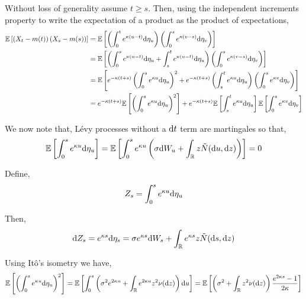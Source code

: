 \documentclass[10pt]{article}
\begin{document}
\begin{solution}[Solution]
\begin{enumerate}[label=(\alph*)]
        Without loss of generality assume \( t\geq s \). Then, using the independent increments property to write the expectation of a product as the product of expectations,
        \begin{align*}
            \mathbb{E} \left[ \left( X_t - m(t) \right) \left( X_s-m(s) \right) \right]
            &= \mathbb{E} \left[ \left( \int_{0}^{t} e^{\kappa(u-t)} \mathrm{d} \eta_u \right) \left( \int_{0}^{s}e^{\kappa(v-s)}\mathrm{d} \eta_v \right) \right]
            \\&= \mathbb{E} \left[ \left( \int_{0}^{s} e^{\kappa(u-t)} \mathrm{d} \eta_u + \int_{s}^{t} e^{\kappa(u-t)} \mathrm{d} \eta_u\right) \left( \int_{0}^{s}e^{\kappa(v-s)}\mathrm{d} \eta_v \right) \right]
            \\&= \mathbb{E} \left[ e^{-\kappa(t+s)} \left(\int_{0}^{s} e^{\kappa u} \mathrm{d} \eta_u \right)^2 + e^{-\kappa(t+s)}\left( \int_{s}^{t} e^{\kappa u} \mathrm{d} \eta_u\right) \left( \int_{0}^{s}e^{\kappa v}\mathrm{d} \eta_v \right) \right] 
            \\&= e^{-\kappa(t+s)}\mathbb{E} \left[ \left(\int_{0}^{s} e^{\kappa u} \mathrm{d} \eta_u \right)^2 \right] + e^{-\kappa(t+s)} \mathbb{E} \left[ \int_{s}^{t} e^{\kappa u} \mathrm{d} \eta_u\right] \mathbb{E}\left[ \int_{0}^{s}e^{\kappa v}\mathrm{d} \eta_v \right] 
        \end{align*}
        
        We now note that, L\'evy processes without a \( \mathrm{d} t \) term are martingales so that,
        \begin{align*}
            \mathbb{E} \left[ \int_{0}^{s} e^{\kappa u} \mathrm{d} \eta_u \right]
            = \mathbb{E} \left[ \int_{0}^{s} e^{\kappa u} \left(\sigma \mathrm{d} W_u + \int_{\mathbb{R}} z \tilde{N}(\mathrm{d} u, \mathrm{d} z) \right) \right] 
            = 0
        \end{align*}
        
        Define,
        \begin{align*}
            Z_s = \int_{0}^{s} e^{\kappa u} \mathrm{d} \eta_u
        \end{align*}

        Then,
        \begin{align*}
            \mathrm{d} Z_s = e^{\kappa s} \mathrm{d} \eta_s 
            = \sigma e^{\kappa s} \mathrm{d} W_s + \int_{\mathbb{R}} e^{\kappa s} z \tilde{N}(\mathrm{d} s,\mathrm{d} z)
        \end{align*}
        
        
        Using It\^o's isometry we have,
        \begin{align*}
            \mathbb{E} \left[ \left( \int_{0}^{s} e^{\kappa u} \mathrm{d} \eta_u \right)^2 \right]
            = \mathbb{E} \left[ \int_{0}^{s} \left(\sigma^2 e^{2\kappa u} + \int_{\mathbb{R}} e^{2\kappa u}z^2 \nu(\mathrm{d} z) \right)\mathrm{d} u \right]
            = \mathbb{E}\left[ \left(\sigma^2 + \int_{\mathbb{R}} z^2 \nu(\mathrm{d} z) \right) \dfrac{e^{2\kappa s}-1}{2\kappa} \right] 
        \end{align*}


\end{enumerate}
\end{solution}
\end{document}
